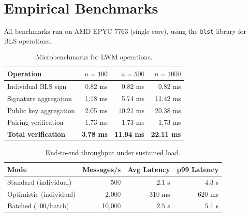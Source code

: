 \section{Empirical Benchmarks}
\label{sec:benchmarks}

All benchmarks run on AMD EPYC 7763 (single core), using the \texttt{blst} library for BLS operations.

\begin{table}[H]
\centering
\caption{Microbenchmarks for LWM operations.}
\label{tab:benchmarks}
\begin{tabular}{lrrr}
\toprule
\textbf{Operation} & \textbf{$n=100$} & \textbf{$n=500$} & \textbf{$n=1000$} \\
\midrule
Individual BLS sign & 0.82 ms & 0.82 ms & 0.82 ms \\
Signature aggregation & 1.18 ms & 5.74 ms & 11.42 ms \\
Public key aggregation & 2.05 ms & 10.21 ms & 20.38 ms \\
Pairing verification & 1.73 ms & 1.73 ms & 1.73 ms \\
\textbf{Total verification} & \textbf{3.78 ms} & \textbf{11.94 ms} & \textbf{22.11 ms} \\
\bottomrule
\end{tabular}
\end{table}

\begin{table}[H]
\centering
\caption{End-to-end throughput under sustained load.}
\label{tab:throughput}
\begin{tabular}{lrrr}
\toprule
\textbf{Mode} & \textbf{Messages/s} & \textbf{Avg Latency} & \textbf{p99 Latency} \\
\midrule
Standard (individual) & 500 & 2.1 s & 4.3 s \\
Optimistic (individual) & 2{,}000 & 310 ms & 620 ms \\
Batched (100/batch) & 10{,}000 & 2.5 s & 5.1 s \\
\bottomrule
\end{tabular}
\end{table}

